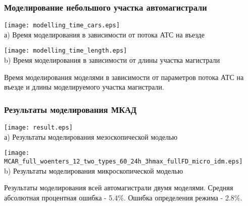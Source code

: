 \begin{frame}
    \frametitle{Моделирование небольшого участка автомагистрали}
    \centering
    \begin{minipage}[b]{.49\textwidth}
        \centering
        \texttt{[image: modelling\_time\_cars.eps]}  \\ а) Время моделирования в зависимости от потока АТС на въезде
    \end{minipage}
    \hfill
    \begin{minipage}[b]{.49\textwidth}
        \centering
        \texttt{[image: modelling\_time\_length.eps]}  \\ b) Время моделирования в зависимости от длины участка магистрали
    \end{minipage}
    \hfill
    Время моделирования моделями в зависимости от параметров потока АТС на въезде и длины моделируемого участка магистрали.
\end{frame}


\begin{frame}
    \frametitle{Результаты моделирования МКАД}
    \centering
    \begin{minipage}[b]{.53\textwidth}
        \centering
        \texttt{[image: result.eps]}  \\ а) Результаты моделирования мезоскопической моделью
    \end{minipage}
    \hfill
    \begin{minipage}[b]{.45\textwidth}
        \centering
        \texttt{[image: MCAR\_full\_woenters\_12\_two\_types\_60\_24h\_3hmax\_fullFD\_micro\_idm.eps]}  \\ b) Результаты моделирования микроскопической моделью
    \end{minipage}
    \hfill
    Результаты моделирования всей автомагистрали двумя моделями. Средняя абсолютная процентная ошибка - 5.4\%.
    Ошибка определения режима - 2.8\%.
\end{frame}


